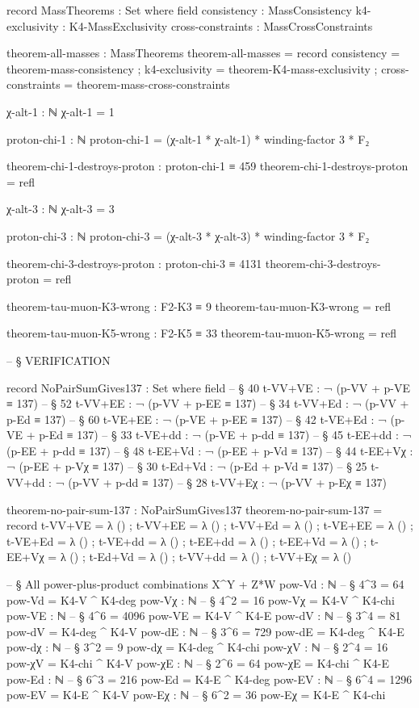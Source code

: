 \documentclass[11pt,a4paper]{book}
\begin{document}
\begin{code}
record MassTheorems : Set where
  field
    consistency       : MassConsistency
    k4-exclusivity    : K4-MassExclusivity
    cross-constraints : MassCrossConstraints

theorem-all-masses : MassTheorems
theorem-all-masses = record
  { consistency       = theorem-mass-consistency
  ; k4-exclusivity    = theorem-K4-mass-exclusivity
  ; cross-constraints = theorem-mass-cross-constraints
  }

χ-alt-1 : ℕ
χ-alt-1 = 1

proton-chi-1 : ℕ
proton-chi-1 = (χ-alt-1 * χ-alt-1) * winding-factor 3 * F₂

theorem-chi-1-destroys-proton : proton-chi-1 ≡ 459
theorem-chi-1-destroys-proton = refl

χ-alt-3 : ℕ
χ-alt-3 = 3

proton-chi-3 : ℕ
proton-chi-3 = (χ-alt-3 * χ-alt-3) * winding-factor 3 * F₂

theorem-chi-3-destroys-proton : proton-chi-3 ≡ 4131
theorem-chi-3-destroys-proton = refl

theorem-tau-muon-K3-wrong : F2-K3 ≡ 9
theorem-tau-muon-K3-wrong = refl

theorem-tau-muon-K5-wrong : F2-K5 ≡ 33
theorem-tau-muon-K5-wrong = refl



-- § VERIFICATION

record NoPairSumGives137 : Set where
  field
    -- § 40
    t-VV+VE : ¬ (p-VV + p-VE ≡ 137)
    -- § 52
    t-VV+EE : ¬ (p-VV + p-EE ≡ 137)
    -- § 34
    t-VV+Ed : ¬ (p-VV + p-Ed ≡ 137)
    -- § 60
    t-VE+EE : ¬ (p-VE + p-EE ≡ 137)
    -- § 42
    t-VE+Ed : ¬ (p-VE + p-Ed ≡ 137)
    -- § 33
    t-VE+dd : ¬ (p-VE + p-dd ≡ 137)
    -- § 45
    t-EE+dd : ¬ (p-EE + p-dd ≡ 137)
    -- § 48
    t-EE+Vd : ¬ (p-EE + p-Vd ≡ 137)
    -- § 44
    t-EE+Vχ : ¬ (p-EE + p-Vχ ≡ 137)
    -- § 30
    t-Ed+Vd : ¬ (p-Ed + p-Vd ≡ 137)
    -- § 25
    t-VV+dd : ¬ (p-VV + p-dd ≡ 137)
    -- § 28
    t-VV+Eχ : ¬ (p-VV + p-Eχ ≡ 137)

theorem-no-pair-sum-137 : NoPairSumGives137
theorem-no-pair-sum-137 = record
  { t-VV+VE = λ () ; t-VV+EE = λ () ; t-VV+Ed = λ ()
  ; t-VE+EE = λ () ; t-VE+Ed = λ () ; t-VE+dd = λ ()
  ; t-EE+dd = λ () ; t-EE+Vd = λ () ; t-EE+Vχ = λ ()
  ; t-Ed+Vd = λ () ; t-VV+dd = λ () ; t-VV+Eχ = λ ()
  }

-- § All power-plus-product combinations X^Y + Z*W
pow-Vd : ℕ
-- § 4^3 = 64
pow-Vd = K4-V ^ K4-deg
pow-Vχ : ℕ
-- § 4^2 = 16
pow-Vχ = K4-V ^ K4-chi
pow-VE : ℕ
-- § 4^6 = 4096
pow-VE = K4-V ^ K4-E
pow-dV : ℕ
-- § 3^4 = 81
pow-dV = K4-deg ^ K4-V
pow-dE : ℕ
-- § 3^6 = 729
pow-dE = K4-deg ^ K4-E
pow-dχ : ℕ
-- § 3^2 = 9
pow-dχ = K4-deg ^ K4-chi
pow-χV : ℕ
-- § 2^4 = 16
pow-χV = K4-chi ^ K4-V
pow-χE : ℕ
-- § 2^6 = 64
pow-χE = K4-chi ^ K4-E
pow-Ed : ℕ
-- § 6^3 = 216
pow-Ed = K4-E ^ K4-deg
pow-EV : ℕ
-- § 6^4 = 1296
pow-EV = K4-E ^ K4-V
pow-Eχ : ℕ
-- § 6^2 = 36
pow-Eχ = K4-E ^ K4-chi


\end{code}
\end{document}
